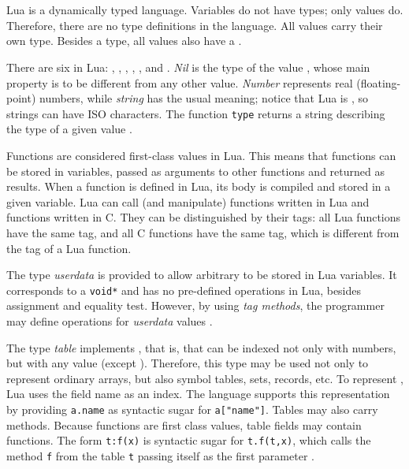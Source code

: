 \section{} \label{TypesSec}

Lua is a dynamically typed language.
Variables do not have types; only values do.
Therefore, there are no type definitions in the language.
All values carry their own type.
Besides a type, all values also have a .

There are six  in Lua: , ,
, , , and .
\emph{Nil} is the type of the value \nil,
whose main property is to be different from any other value.
\emph{Number} represents real (floating-point) numbers,
while \emph{string} has the usual meaning;
notice that Lua is ,
so strings can have ISO characters.
The function \verb|type| returns a string describing the type
of a given value .

Functions are considered first-class values in Lua.
This means that functions can be stored in variables,
passed as arguments to other functions and returned as results.
When a function is defined in Lua, its body is compiled and stored
in a given variable.
Lua can call (and manipulate) functions written in Lua and
functions written in C.
They can be distinguished by their tags:
all Lua functions have the same tag,
and all C functions have the same tag,
which is different from the tag of a Lua function.

The type \emph{userdata} is provided to allow
arbitrary  to be stored in Lua variables.
It corresponds to a \verb|void*| and has no pre-defined operations in Lua,
besides assignment and equality test.
However, by using \emph{tag methods},
the programmer may define operations for \emph{userdata} values
.

The type \emph{table} implements ,
that is,  that can be indexed not only with numbers,
but with any value (except \nil).
Therefore, this type may be used not only to represent ordinary arrays,
but also symbol tables, sets, records, etc.
To represent , Lua uses the field name as an index.
The language supports this representation by
providing \verb|a.name| as syntactic sugar for \verb|a["name"]|.
Tables may also carry methods.
Because functions are first class values,
table fields may contain functions.
The form \verb|t:f(x)| is syntactic sugar for \verb|t.f(t,x)|,
which calls the method \verb|f| from the table \verb|t| passing
itself as the first parameter .

